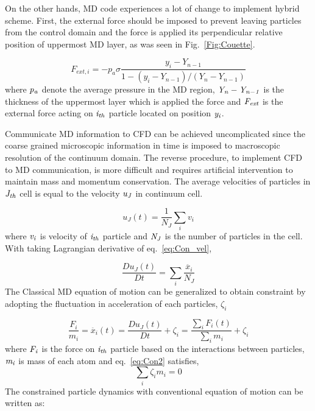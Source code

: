 \documentclass[conference,final]{IEEEtran}
\begin{document}
On the other hands, MD code experiences a lot of change to implement hybrid scheme. First, the external force should be imposed to prevent leaving particles from the control domain and the force is applied its perpendicular relative position of uppermost MD layer, as was seen in Fig.~\ref{Fig:Couette}.

\vspace{-.2em}
\begin{equation}
 F_{ext, i} = -p_{a}\sigma\frac{y_{i}-Y_{n-1}}{1-(y_{i}-Y_{n-1})/(Y_{n}-Y_{n-1})}
 \label{eq:Con_vel}
\end{equation}
\normalsize
where $\it p_{a}$ denote the average pressure in the MD region, $\it Y_{n}-Y_{n-1}$ is the thickness of the uppermost layer which is applied the force and $\it F_{ext}$ is the external force acting on $\it i_{th}$ particle located on position $\it y_{i}$.

Communicate MD information to CFD can be achieved uncomplicated since the coarse grained microscopic information in time is imposed to macroscopic resolution of the continuum domain. The reverse procedure, to implement  CFD to MD communication, is more difficult and requires artificial intervention to maintain mass and momentum conservation. The average velocities of particles in $\it J_{th}$ cell is equal to the velocity $\it u_{J}$ in continuum cell.

\vspace{-.2em}
\begin{equation}
 u_{J}(t) = \frac{1}{N_{J}} \displaystyle\sum_{i} v_{i}
 \label{eq:Con_vel}
\end{equation}
\normalsize
where $\it v_{i}$ is velocity of  $\it i_{th}$ particle and $\it N_{J}$ is the number of particles in the cell.   With taking Lagrangian derivative  of eq.~\ref{eq:Con_vel},

\vspace{-.2em}
\begin{equation}
 \frac{Du_{J}(t)}{Dt} =  \displaystyle\sum_{i} \frac{\ddot{x_{i}}}{N_{J}}
 \label{eq:Lagrangian}
\end{equation}
\normalsize
The Classical MD equation of motion can be generalized to obtain constraint by adopting the fluctuation in acceleration of each particles, $\zeta_{i}$

\vspace{-.2em}
\begin{equation}
 \frac{F_{i}}{m_{i}} = \ddot{x_{i}}(t)  =   \frac{Du_{J}(t)}{Dt} + \zeta_{i} = \frac{\displaystyle\sum_{i}F_{i}(t)} {\displaystyle\sum_{i}m_{i}} +   \zeta_{i}
 \label{eq:Con2}
\end{equation}
\normalsize
where $\it F_{i}$ is the force on $\it i_{th}$ particle based on the interactions between particles,  $\it m_{i}$ is mass of each atom and  eq.~\ref{eq:Con2} satisfies,
\vspace{-.2em}
\begin{equation}
\displaystyle\sum_{i}\zeta_{i}m_{i} = 0
 \label{eq:Con2}
\end{equation}
\normalsize
The constrained particle dynamics with conventional equation of motion can be written as:
\end{document}
